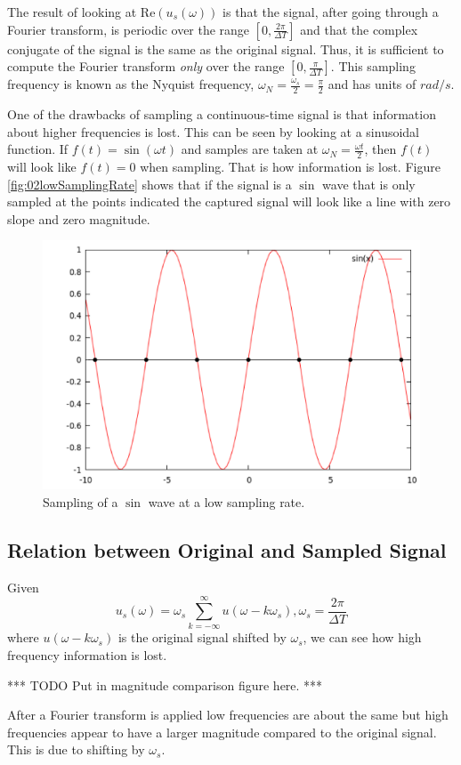 \documentclass[lecture,12pt,]{pcms-l}
\newcommand{\w}{\omega}
\begin{document}
The result of looking at $\text{Re}(u_s(\w))$ is that the signal, after going through a Fourier transform, is periodic over the range $[0, \frac{2\pi}{\Delta T}]$ and that the complex conjugate of the signal is the same as the original signal. Thus, it is sufficient to compute the Fourier transform \textit{only} over the range $[0, \frac{\pi}{\Delta T}]$. This sampling frequency is known as the Nyquist frequency, $\w_N = \frac{\w_s}{2} = \frac{\pi}{2}$ and has units of $rad/s$.

One of the drawbacks of sampling a continuous-time signal is that information about higher frequencies is lost. This can be seen by looking at a sinusoidal function. If $f(t) = \sin(\w t)$ and samples are taken at $\w_N = \frac{\w t}{2}$, then $f(t)$ will look like $f(t) = 0$ when sampling. That is how information is lost. Figure \ref{fig:02lowSamplingRate} shows that if the signal is a $\sin$ wave that is only sampled at the points indicated the captured signal will look like a line with zero slope and zero magnitude.
\begin{figure}[ht!]
	\centering
	\includegraphics[width=.5\textwidth]{images/02lowSampleRate}
	\caption{Sampling of a $\sin$ wave at a low sampling rate.}
	\label{fig:02lowSampleRate}
\end{figure}

\subsection{Relation between Original and Sampled Signal}
Given
$$u_s(\w) = \w_s \sum_{k=-\infty}^\infty u(\w-k\w_s), \w_s = \frac{2\pi}{\Delta T}$$
where $u(\w-k\w_s)$ is the original signal shifted by $\w_s$, we can see how high frequency information is lost.

*** TODO Put in magnitude comparison figure here. ***

After a Fourier transform is applied low frequencies are about the same but high frequencies appear to have a larger magnitude compared to the original signal. This is due to shifting by $\w_s$.
\end{document}
